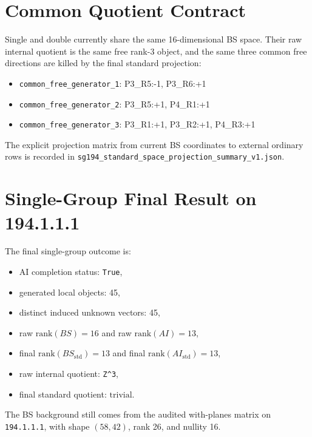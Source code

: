 \documentclass[11pt]{article}
\begin{document}
\section{Common Quotient Contract}
Single and double currently share the same 16-dimensional BS space. Their raw internal quotient is the same free rank-3 object, and the same three common free directions are killed by the final standard projection:
\begin{itemize}
\item \texttt{common\_free\_generator\_1}: P3\_R5:-1, P3\_R6:+1
\item \texttt{common\_free\_generator\_2}: P3\_R5:+1, P4\_R1:+1
\item \texttt{common\_free\_generator\_3}: P3\_R1:+1, P3\_R2:+1, P4\_R3:+1
\end{itemize}

The explicit projection matrix from current BS coordinates to external ordinary rows is recorded in \texttt{sg194\_standard\_space\_projection\_summary\_v1.json}.

\section{Single-Group Final Result on 194.1.1.1}
The final single-group outcome is:
\begin{itemize}
\item AI completion status: \texttt{True},
\item generated local objects: 45,
\item distinct induced unknown vectors: 45,
\item raw $\mathrm{rank}(BS) = 16$ and raw $\mathrm{rank}(AI) = 13$,
\item final $\mathrm{rank}(BS_{\mathrm{std}}) = 13$ and final $\mathrm{rank}(AI_{\mathrm{std}}) = 13$,
\item raw internal quotient: \texttt{Z\textasciicircum{}3},
\item final standard quotient: $\mathrm{trivial}$.
\end{itemize}
The BS background still comes from the audited with-planes matrix on \texttt{194.1.1.1}, with shape $(58,42)$, rank 26, and nullity 16.
\end{document}

